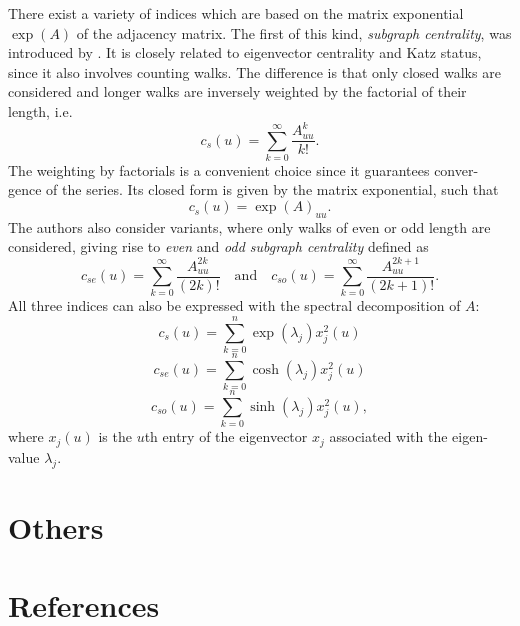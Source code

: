\documentclass[]{book}
\theoremstyle{definition}
\theoremstyle{definition}
\theoremstyle{definition}
\theoremstyle{remark}
\begin{document}
There exist a variety of indices which are based on the matrix
exponential \(\exp(A)\) of the adjacency matrix. The first of this kind,
\emph{subgraph centrality}, was introduced by \citet{er-sccn-05}. It is
closely related to eigenvector centrality and Katz status, since it also
involves counting walks. The difference is that only closed walks are
considered and longer walks are inversely weighted by the factorial of
their length, i.e. \[
c_s(u)=\sum_{k=0}^\infty\frac{A^k_{uu}}{k!}.
\] The weighting by factorials is a convenient choice since it
guarantees conver- gence of the series. Its closed form is given by the
matrix exponential, such that \[
c_s(u)=\exp(A)_{uu}.
\] The authors also consider variants, where only walks of even or odd
length are considered, giving rise to \emph{even} and \emph{odd subgraph
centrality} defined as \[
c_{se}(u)=\sum_{k=0}^\infty\frac{A^{2k}_{uu}}{(2k)!} \quad \text{and} \quad c_{so}(u)=\sum_{k=0}^\infty\frac{A^{2k+1}_{uu}}{(2k+1)!}.
\] All three indices can also be expressed with the spectral
decomposition of \(A\): \[
  c_s(u)=\sum_{k=0}^n \exp(\lambda_j) x_j^2(u)
\] \[
  c_{se}(u)=\sum_{k=0}^n \cosh(\lambda_j) x_j^2(u)
\] \[
  c_{so}(u)=\sum_{k=0}^n \sinh(\lambda_j) x_j^2(u),
\] where \(x_j(u)\) is the \(u\)th entry of the eigenvector \(x_j\)
associated with the eigen- value \(\lambda_j\).

\hypertarget{others}{%
\section{Others}\label{others}}

\hypertarget{references}{%
\section{References}\label{references}}


\end{document}
